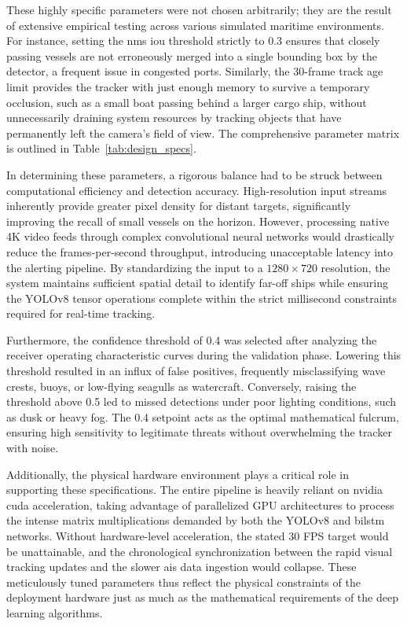 These highly specific parameters were not chosen arbitrarily; they are the result of extensive empirical testing across various simulated maritime environments. For instance, setting the \gls{nms} \gls{iou} threshold strictly to 0.3 ensures that closely passing vessels are not erroneously merged into a single bounding box by the detector, a frequent issue in congested ports. Similarly, the 30-frame track age limit provides the tracker with just enough memory to survive a temporary occlusion, such as a small boat passing behind a larger cargo ship, without unnecessarily draining system resources by tracking objects that have permanently left the camera's field of view. The comprehensive parameter matrix is outlined in Table~\ref{tab:design_specs}.

In determining these parameters, a rigorous balance had to be struck between computational efficiency and detection accuracy. High-resolution input streams inherently provide greater pixel density for distant targets, significantly improving the recall of small vessels on the horizon. However, processing native 4K video feeds through complex convolutional neural networks would drastically reduce the frames-per-second throughput, introducing unacceptable latency into the alerting pipeline. By standardizing the input to a $1280 \times 720$ resolution, the system maintains sufficient spatial detail to identify far-off ships while ensuring the YOLOv8 tensor operations complete within the strict millisecond constraints required for real-time tracking.

Furthermore, the confidence threshold of 0.4 was selected after analyzing the receiver operating characteristic curves during the validation phase. Lowering this threshold resulted in an influx of false positives, frequently misclassifying wave crests, buoys, or low-flying seagulls as watercraft. Conversely, raising the threshold above 0.5 led to missed detections under poor lighting conditions, such as dusk or heavy fog. The 0.4 setpoint acts as the optimal mathematical fulcrum, ensuring high sensitivity to legitimate threats without overwhelming the tracker with noise.

Additionally, the physical hardware environment plays a critical role in supporting these specifications. The entire pipeline is heavily reliant on \gls{nvidia} \gls{cuda} acceleration, taking advantage of parallelized GPU architectures to process the intense matrix multiplications demanded by both the YOLOv8 and \gls{bilstm} networks. Without hardware-level acceleration, the stated 30 FPS target would be unattainable, and the chronological synchronization between the rapid visual tracking updates and the slower \gls{ais} data ingestion would collapse. These meticulously tuned parameters thus reflect the physical constraints of the deployment hardware just as much as the mathematical requirements of the deep learning algorithms.


